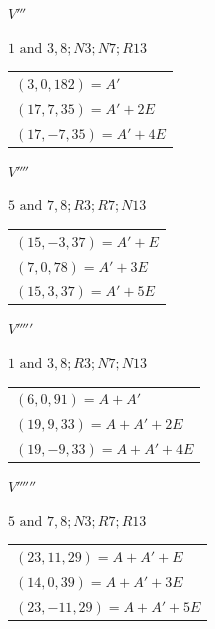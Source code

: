 \begin{center}
\begin{minipage}[t]{0.47\linewidth}\centering
\(V'''\)\par\smallskip
{\small \(1\text{ and }3, 8; N3; N7; R13\)}\par\smallskip
\begin{tabular}{@{}l@{}}
\((3,0,182)=A'\)\\\((17,7,35)=A'+2E\)\\\((17,-7,35)=A'+4E\)
\end{tabular}
\end{minipage}\hfill\begin{minipage}[t]{0.47\linewidth}\centering
\(V''''\)\par\smallskip
{\small \(5\text{ and }7, 8; R3; R7; N13\)}\par\smallskip
\begin{tabular}{@{}l@{}}
\((15,-3,37)=A'+E\)\\\((7,0,78)=A'+3E\)\\\((15,3,37)=A'+5E\)
\end{tabular}
\end{minipage}
\end{center}
\begin{center}
\begin{minipage}[t]{0.47\linewidth}\centering
\(V'''''\)\par\smallskip
{\small \(1\text{ and }3, 8; R3; N7; N13\)}\par\smallskip
\begin{tabular}{@{}l@{}}
\((6,0,91)=A+A'\)\\\((19,9,33)=A+A'+2E\)\\\((19,-9,33)=A+A'+4E\)
\end{tabular}
\end{minipage}\hfill\begin{minipage}[t]{0.47\linewidth}\centering
\(V''''''\)\par\smallskip
{\small \(5\text{ and }7, 8; N3; R7; R13\)}\par\smallskip
\begin{tabular}{@{}l@{}}
\((23,11,29)=A+A'+E\)\\\((14,0,39)=A+A'+3E\)\\\((23,-11,29)=A+A'+5E\)
\end{tabular}
\end{minipage}
\end{center}
